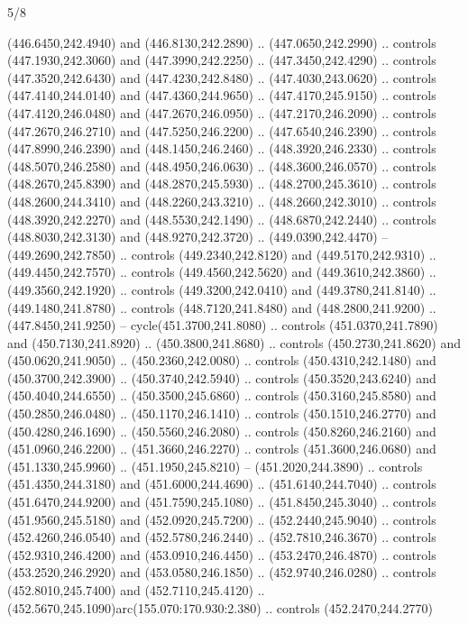 \begin{flagdescription}{5/8}
\begin{scope}[xshift=0.5\flaglength,yshift=0.5\flagwidth,scale=\flagwidth/475.63]
\begin{scope}[y=0.8pt, x=0.8pt, yscale=-1, xscale=1,shift={(-450,-300)}]
\begin{scope}[cm={{1.0,0.0,0.0,1.0,(-0.0002,0.12556)}},cm={{1.0,0.0,0.0,1.0,(0.00179,0.0)}}]
\begin{scope}[cm={{1.00926,0.0,0.0,1.00926,(-3.1541,-2.47648)}}]
  (446.6450,242.4940) and (446.8130,242.2890) .. (447.0650,242.2990) .. controls
  (447.1930,242.3060) and (447.3990,242.2250) .. (447.3450,242.4290) .. controls
  (447.3520,242.6430) and (447.4230,242.8480) .. (447.4030,243.0620) .. controls
  (447.4140,244.0140) and (447.4360,244.9650) .. (447.4170,245.9150) .. controls
  (447.4120,246.0480) and (447.2670,246.0950) .. (447.2170,246.2090) .. controls
  (447.2670,246.2710) and (447.5250,246.2200) .. (447.6540,246.2390) .. controls
  (447.8990,246.2390) and (448.1450,246.2460) .. (448.3920,246.2330) .. controls
  (448.5070,246.2580) and (448.4950,246.0630) .. (448.3600,246.0570) .. controls
  (448.2670,245.8390) and (448.2870,245.5930) .. (448.2700,245.3610) .. controls
  (448.2600,244.3410) and (448.2260,243.3210) .. (448.2660,242.3010) .. controls
  (448.3920,242.2270) and (448.5530,242.1490) .. (448.6870,242.2440) .. controls
  (448.8030,242.3130) and (448.9270,242.3720) .. (449.0390,242.4470) --
  (449.2690,242.7850) .. controls (449.2340,242.8120) and (449.5170,242.9310) ..
  (449.4450,242.7570) .. controls (449.4560,242.5620) and (449.3610,242.3860) ..
  (449.3560,242.1920) .. controls (449.3200,242.0410) and (449.3780,241.8140) ..
  (449.1480,241.8780) .. controls (448.7120,241.8480) and (448.2800,241.9200) ..
  (447.8450,241.9250) -- cycle(451.3700,241.8080) .. controls
  (451.0370,241.7890) and (450.7130,241.8920) .. (450.3800,241.8680) .. controls
  (450.2730,241.8620) and (450.0620,241.9050) .. (450.2360,242.0080) .. controls
  (450.4310,242.1480) and (450.3700,242.3900) .. (450.3740,242.5940) .. controls
  (450.3520,243.6240) and (450.4040,244.6550) .. (450.3500,245.6860) .. controls
  (450.3160,245.8580) and (450.2850,246.0480) .. (450.1170,246.1410) .. controls
  (450.1510,246.2770) and (450.4280,246.1690) .. (450.5560,246.2080) .. controls
  (450.8260,246.2160) and (451.0960,246.2200) .. (451.3660,246.2270) .. controls
  (451.3600,246.0680) and (451.1330,245.9960) .. (451.1950,245.8210) --
  (451.2020,244.3890) .. controls (451.4350,244.3180) and (451.6000,244.4690) ..
  (451.6140,244.7040) .. controls (451.6470,244.9200) and (451.7590,245.1080) ..
  (451.8450,245.3040) .. controls (451.9560,245.5180) and (452.0920,245.7200) ..
  (452.2440,245.9040) .. controls (452.4260,246.0540) and (452.5780,246.2440) ..
  (452.7810,246.3670) .. controls (452.9310,246.4200) and (453.0910,246.4450) ..
  (453.2470,246.4870) .. controls (453.2520,246.2920) and (453.0580,246.1850) ..
  (452.9740,246.0280) .. controls (452.8010,245.7400) and (452.7110,245.4120) ..
  (452.5670,245.1090)arc(155.070:170.930:2.380) .. controls (452.2470,244.2770)

\end{scope}
\end{scope}
\end{scope}
\end{scope}
\end{flagdescription}
